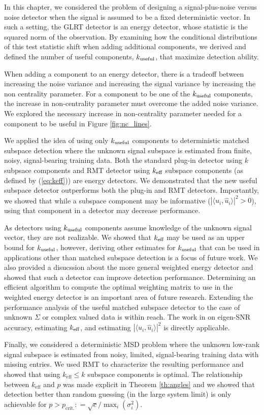 In this chapter, we considered the problem of designing a signal-plus-noise versus noise
detector when the signal is assumed to be a fixed deterministic vector. In such a setting,
the GLRT detector is an energy detector, whose statistic is the squared norm of the
observation. By examining how the conditional distributions of this test statistic shift
when adding additional components, we derived and defined the number of useful components,
$k_{\text{useful}}$, that maximize detection ability.

When adding a component to an energy detector, there is a tradeoff between increasing the
noise variance and increasing the signal variance by increasing the non centrality
parameter. For a component to be one of the $k_{\text{useful}}$ components, the increase in
non-centrality parameter must overcome the added noise variance. We explored the necessary
increase in non-centrality parameter needed for a component to be useful in Figure
\ref{fig:nc_lines}.

We applied the idea of using only $k_{\text{useful}}$ components to deterministic matched subspace
detection where the unknown signal subspace is estimated from finite, noisy,
signal-bearing training data. Both the standard plug-in detector using $k$ subpsace
components and RMT detector using $k_\text{eff}$ subspace components (as defined by
(\ref{eq:keff})) are energy detectors. We demonstrated that the new useful subspace
detector outperforms both the plug-in and RMT detectors. Importantly, we showed that while
a subspace component may be informative ($|\langle u_i,\widehat{u}_i\rangle|^2 >0$), using
that component in a detector may decrease performance.

As detectors using $k_{\text{useful}}$ components assume knowledge of the unknown signal vector, they
are not realizable. We showed that $k_\text{eff}$ may be used as an upper bound for $k_{\text{useful}}$,
however, deriving other estimates for $k_{\text{useful}}$ that can be used in applications other than
matched subspace detection is a focus of future work. We also provided a disucssion about
the more general weighted energy detector and showed that such a detector can improve
detection performance. Determining an efficient algorithm to compute the optimal weighting
matrix to use in the weighted energy detector is an important area of future
research. Extending the performance analysis of the useful matched subspace detector to
the case of unknown $\Sigma$ or complex valued data is within reach. The work in
\cite{asendorf2013performance} on eigen-SNR accuracy, estimating $k_\text{eff}$, and estimating
$|\langle u_i,\widehat{u}_i\rangle|^2$ is directly applicable.

Finally, we considered a deterministic MSD problem where the unknown low-rank signal subspace is
estimated from noisy, limited, signal-bearing training data with missing entries.  We used
RMT to characterize the resulting performance and showed that using $k_\text{eff} \leq k$
subspace components is optimal. The relationship between $k_{\text{eff}}$ and $p$ was made
explicit in Theorem \ref{th:angles} and we showed that detection better than random
guessing (in the large system limit) is only achievable for $p > p_{\text{crit.}} : =
\sqrt{c}/\max_{i}(\sigma_{i}^{2})$.
